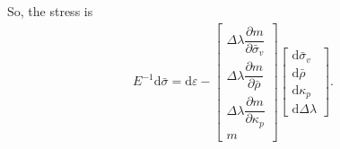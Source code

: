 \documentclass[5p]{elsarticle}
\newcommand*{\md}[1]{\mathrm{d}#1}
\newcommand*{\pdfrac}[2]{\dfrac{\partial#1}{\partial#2}}
\begin{document}
So, the stress is
\begin{gather}
E^{-1}\md{\bar{\sigma}}=\md{\varepsilon}-
\begin{bmatrix}
\Delta\lambda\pdfrac{m}{\bar{\sigma}_v}\\\Delta\lambda\pdfrac{m}{\bar{\rho}}\\\Delta\lambda\pdfrac{m}{\kappa_p}\\m
\end{bmatrix}\begin{bmatrix}
\md{\bar{\sigma}_v}\\\md{\bar{\rho}}\\\md{\kappa_p}\\\md{\Delta\lambda}
\end{bmatrix}.
\end{gather}
\end{document}
